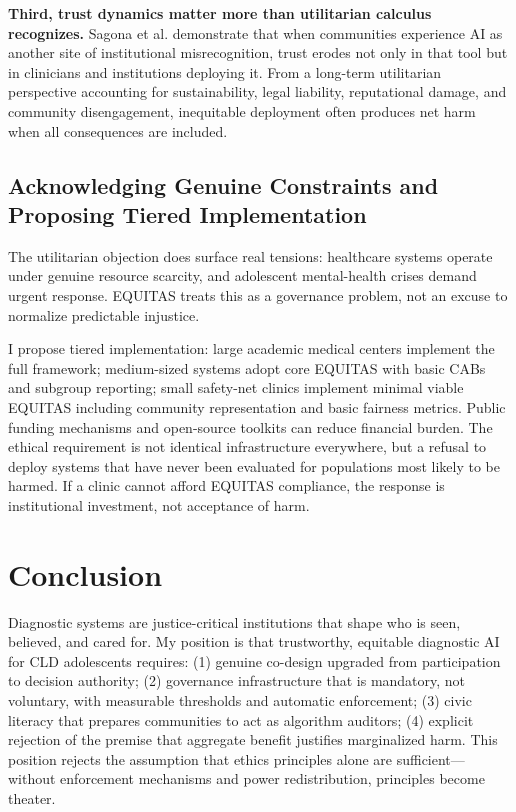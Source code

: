 \documentclass[12pt,a4paper]{article}
\begin{document}
\textbf{Third, trust dynamics matter more than utilitarian calculus recognizes.} Sagona et al. demonstrate that when communities experience AI as another site of institutional misrecognition, trust erodes not only in that tool but in clinicians and institutions deploying it.\cite{sagona2025} From a long-term utilitarian perspective accounting for sustainability, legal liability, reputational damage, and community disengagement, inequitable deployment often produces net harm when all consequences are included.\cite{sagona2025}

\subsection{Acknowledging Genuine Constraints and Proposing Tiered Implementation}

The utilitarian objection does surface real tensions: healthcare systems operate under genuine resource scarcity, and adolescent mental-health crises demand urgent response. EQUITAS treats this as a governance problem, not an excuse to normalize predictable injustice.

I propose tiered implementation: large academic medical centers implement the full framework; medium-sized systems adopt core EQUITAS with basic CABs and subgroup reporting; small safety-net clinics implement minimal viable EQUITAS including community representation and basic fairness metrics. Public funding mechanisms and open-source toolkits can reduce financial burden. The ethical requirement is not identical infrastructure everywhere, but a refusal to deploy systems that have never been evaluated for populations most likely to be harmed. If a clinic cannot afford EQUITAS compliance, the response is institutional investment, not acceptance of harm.

\section{Conclusion}

Diagnostic systems are justice-critical institutions that shape who is seen, believed, and cared for. My position is that trustworthy, equitable diagnostic AI for CLD adolescents requires: (1) genuine co-design upgraded from participation to decision authority; (2) governance infrastructure that is mandatory, not voluntary, with measurable thresholds and automatic enforcement; (3) civic literacy that prepares communities to act as algorithm auditors; (4) explicit rejection of the premise that aggregate benefit justifies marginalized harm. This position rejects the assumption that ethics principles alone are sufficient—without enforcement mechanisms and power redistribution, principles become theater.
\end{document}

